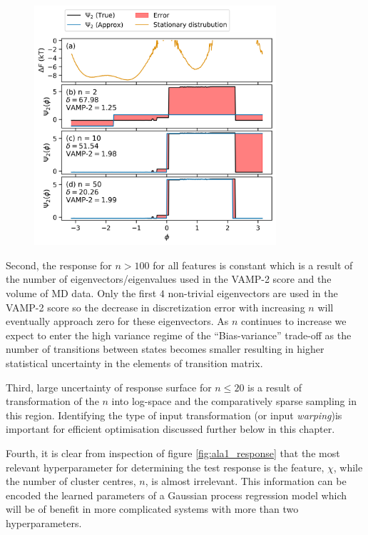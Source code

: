 \begin{figure}
    \centering
    \caption{}
    \label{fig:ala1_evcompare}
    \includegraphics[width=0.8\textwidth]{chapters/msm_optimization/figures/ala1_ev_n_compare.png}
\end{figure}

Second, the response for $n > 100$ for all features is constant which is a result of the number of eigenvectors/eigenvalues used in the VAMP-2 score and the volume of MD data. Only the first $4$ non-trivial eigenvectors are used in the VAMP-2 score so the decrease in discretization error with increasing $n$ will eventually approach zero for these eigenvectors. As $n$ continues to increase we expect to enter the high variance regime of the ``Bias-variance'' trade-off as the number of transitions between states becomes smaller resulting in higher statistical uncertainty in the elements of transition matrix. 

Third, large uncertainty of response surface for $n \leq 20$ is a result of transformation of the $n$ into log-space and the comparatively sparse sampling in this region. Identifying the type of input transformation (or input \emph{warping})is important for efficient optimisation \cite{snoekInputWarpingBayesian2014} discussed further below in this chapter.

Fourth, it is clear from inspection of figure \ref{fig:ala1_response} that the most relevant hyperparameter for determining the test response is the feature, $\chi$, while the number of cluster centres,  $n$, is almost irrelevant. This information can be encoded the learned parameters of a Gaussian process regression model which will be of benefit in more complicated systems with more than two hyperparameters. 
 
